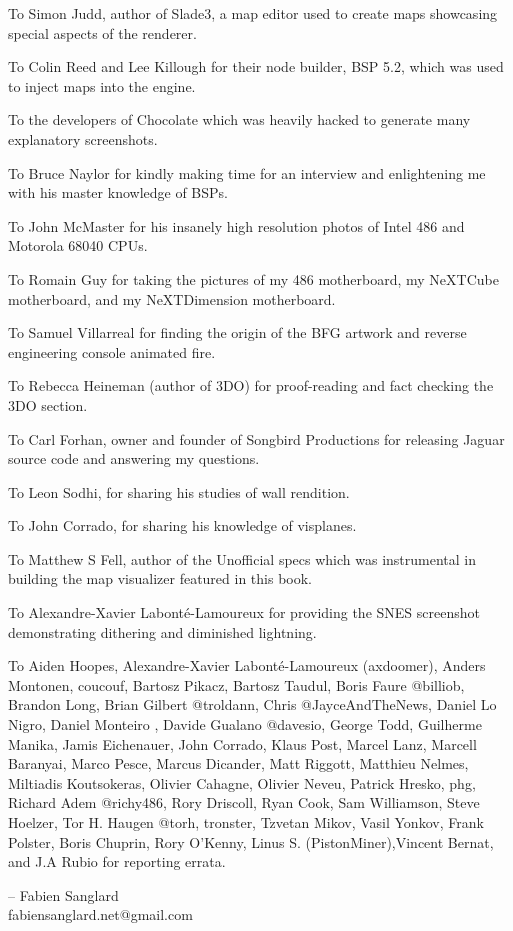 \par
To Simon Judd, author of Slade3, a map editor used to create maps showcasing special aspects of the renderer.\\
\par
To Colin Reed and Lee Killough for their node builder, BSP 5.2, which was used to inject maps into the \doom{} engine.\\
\par
To the developers of Chocolate \doom{} which was heavily hacked to generate many explanatory screenshots.\\
\par
To Bruce Naylor for kindly making time for an interview and enlightening me with his master knowledge of BSPs.\\
\par
To John McMaster for his insanely high resolution photos of Intel 486 and Motorola 68040 CPUs.\\
\par
To Romain Guy for taking the pictures of my 486 motherboard, my NeXTCube motherboard, and my NeXTDimension motherboard.\\
\par
To Samuel Villarreal for finding the origin of the BFG artwork and reverse engineering \doom{} console animated fire.\\
\par
To Rebecca Heineman (author of \doom{} 3DO) for proof-reading and fact checking the 3DO section.\\
\par
To Carl Forhan, owner and founder of Songbird Productions for releasing \doom{} Jaguar source code and answering my questions.\\
\par
To Leon Sodhi, for sharing his studies of \doom{} wall rendition.\\
\par
To John Corrado, for sharing his knowledge of visplanes.\\
\par
To Matthew S Fell, author of the Unofficial \doom{} specs which was instrumental in building the map visualizer featured in this book.\\
\par
To Alexandre-Xavier Labont\'{e}-Lamoureux for providing the SNES screenshot demonstrating dithering and diminished lightning.\\
\par
To Aiden Hoopes, Alexandre-Xavier Labont\'{e}-Lamoureux (axdoomer), Anders Montonen, coucouf, Bartosz Pikacz, Bartosz Taudul, Boris Faure @billiob, Brandon Long, Brian Gilbert @troldann, Chris @JayceAndTheNews, Daniel Lo Nigro, Daniel Monteiro , Davide Gualano @davesio, George Todd, Guilherme Manika, Jamis Eichenauer, John Corrado, Klaus Post, Marcel Lanz, Marcell Baranyai, Marco Pesce, Marcus Dicander, Matt Riggott, Matthieu Nelmes, Miltiadis Koutsokeras, Olivier Cahagne, Olivier Neveu, Patrick Hresko, phg, Richard Adem @richy486, Rory Driscoll, Ryan Cook, Sam Williamson, Steve Hoelzer, Tor H. Haugen @torh, tronster, Tzvetan Mikov, Vasil Yonkov, Frank Polster, Boris Chuprin, Rory O'Kenny, Linus S. (PistonMiner),Vincent Bernat, and J.A Rubio for reporting errata.\\
\par
-- Fabien Sanglard\\
fabiensanglard.net@gmail.com
